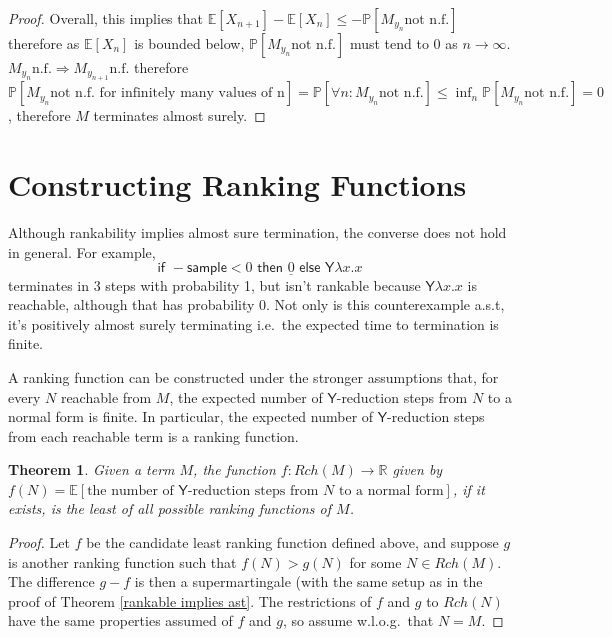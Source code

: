 \documentclass{article}
\newcommand{\tY}{\textsf{Y}}
\newcommand{\tif}[3]{\textsf{if }#1\textsf{ then }#2\textsf{ else }#3}
\newcommand{\tsample}{\textsf{sample}}
\newtheorem{theorem}{Theorem}
\begin{document}
\begin{proof}
Overall, this implies that $\mathbb{E}[X_{n+1}] - \mathbb{E}[X_{n}] \leq -\mathbb P[M_{y_n} \text{not n.f.}]$ therefore as $\mathbb{E}[X_n]$ is bounded below, $\mathbb P[M_{y_n} \text{not n.f.}]$ must tend to 0 as $n \to \infty$. $M_{y_n} \text{n.f.} \Rightarrow M_{y_{n+1}} \text{n.f.}$ therefore $\mathbb P[M_{y_n} \text{not n.f.~for infinitely many values of n}] = \mathbb P[\forall n: M_{y_n} \text{not n.f.}] \leq \inf_n \mathbb P[M_{y_n} \text{not n.f.}] = 0$, therefore $M$ terminates almost surely.
\end{proof}

\section{Constructing Ranking Functions}
Although rankability implies almost sure termination, the converse does not hold in general. For example,
\begin{equation}
\tif{-\tsample < 0}{\underline{0}}{\tY \lambda x. x}
\end{equation}
terminates in 3 steps with probability 1, but isn't rankable because $\tY \lambda x. x$ is reachable, although that has probability 0. Not only is this counterexample a.s.t, it's positively almost surely terminating i.e.~the expected time to termination is finite.

A ranking function can be constructed under the stronger assumptions that, for every $N$ reachable from $M$, the expected number of $\tY$-reduction steps from $N$ to a normal form is finite. In particular, the expected number of $\tY$-reduction steps from each reachable term is a ranking function.

\begin{theorem} \label{minimal}
Given a term $M$, the function $f:Rch(M) \to \mathbb R$ given by $f(N) = \mathbb E [\text{the number of }\tY\text{-reduction steps from }N\text{ to a normal form}]$, if it exists, is the least of all possible ranking functions of $M$.
\end{theorem}
\begin{proof}
Let $f$ be the candidate least ranking function defined above, and suppose $g$ is another ranking function such that $f(N) > g(N)$ for some $N \in Rch(M)$. The difference $g - f$ is then a supermartingale (with the same setup as in the proof of Theorem \ref{rankable implies ast}. The restrictions of $f$ and $g$ to $Rch(N)$ have the same properties assumed of $f$ and $g$, so assume w.l.o.g.~that $N=M$.

\end{proof}
\end{document}
